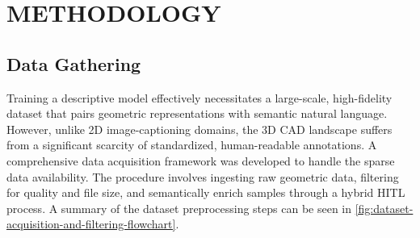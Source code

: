 \renewcommand{\thechapter}{\Roman{chapter}}
\chapter[]{METHODOLOGY}
\renewcommand{\thechapter}{\arabic{chapter}}
\begingroup
\fontsize{12bp}{\baselineskip}\selectfont
\section{Data Gathering}
	Training a descriptive model effectively necessitates a large-scale, high-fidelity dataset that pairs geometric representations with semantic natural language. However, unlike 2D image-captioning domains, the 3D CAD landscape suffers from a significant scarcity of standardized, human-readable annotations. A comprehensive data acquisition framework was developed to handle the sparse data availability. The procedure involves ingesting raw geometric data, filtering for quality and file size, and semantically enrich samples through a hybrid HITL process. A summary of the dataset preprocessing steps can be seen in \autoref{fig:dataset-acquisition-and-filtering-flowchart}.
	
